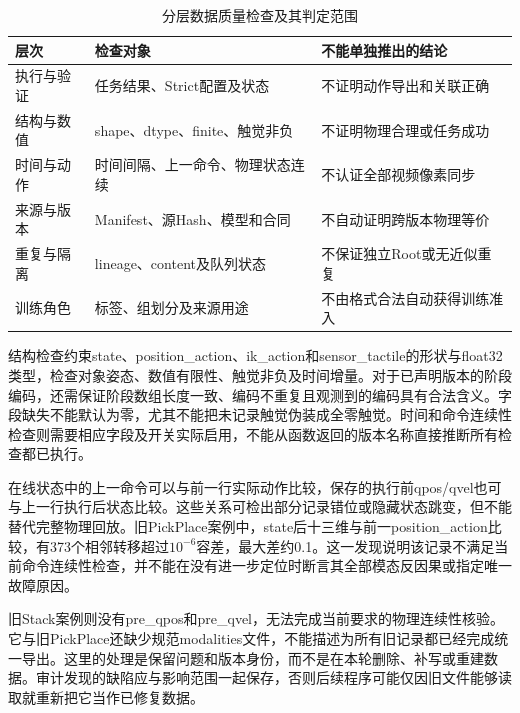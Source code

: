 \begin{table}[htbp]
 \centering\small
 \caption{分层数据质量检查及其判定范围}
 \label{tab:ch04_quality_gates}
 \begin{tabular}{p{}p{}p{}}
 \hline
 层次 & 检查对象 & 不能单独推出的结论\\
 \hline
 执行与验证 & 任务结果、Strict配置及状态 & 不证明动作导出和关联正确\\
 结构与数值 & shape、dtype、finite、触觉非负 & 不证明物理合理或任务成功\\
 时间与动作 & 时间间隔、上一命令、物理状态连续 & 不认证全部视频像素同步\\
 来源与版本 & Manifest、源Hash、模型和合同 & 不自动证明跨版本物理等价\\
 重复与隔离 & lineage、content及队列状态 & 不保证独立Root或无近似重复\\
 训练角色 & 标签、组划分及来源用途 & 不由格式合法自动获得训练准入\\
 \hline
 \end{tabular}
\end{table}

结构检查约束state、position\_action、ik\_action和sensor\_tactile的形状与float32类型，检查对象姿态、数值有限性、触觉非负及时间增量。对于已声明版本的阶段编码，还需保证阶段数组长度一致、编码不重复且观测到的编码具有合法含义。字段缺失不能默认为零，尤其不能把未记录触觉伪装成全零触觉。时间和命令连续性检查则需要相应字段及开关实际启用，不能从函数返回的版本名称直接推断所有检查都已执行。

在线状态中的上一命令可以与前一行实际动作比较，保存的执行前qpos/qvel也可与上一行执行后状态比较。这些关系可检出部分记录错位或隐藏状态跳变，但不能替代完整物理回放。旧PickPlace案例中，state后十三维与前一position\_action比较，有373个相邻转移超过$10^{-6}$容差，最大差约0.1。这一发现说明该记录不满足当前命令连续性检查，并不能在没有进一步定位时断言其全部模态反因果或指定唯一故障原因。

旧Stack案例则没有pre\_qpos和pre\_qvel，无法完成当前要求的物理连续性核验。它与旧PickPlace还缺少规范modalities文件，不能描述为所有旧记录都已经完成统一导出。这里的处理是保留问题和版本身份，而不是在本轮删除、补写或重建数据。审计发现的缺陷应与影响范围一起保存，否则后续程序可能仅因旧文件能够读取就重新把它当作已修复数据。

